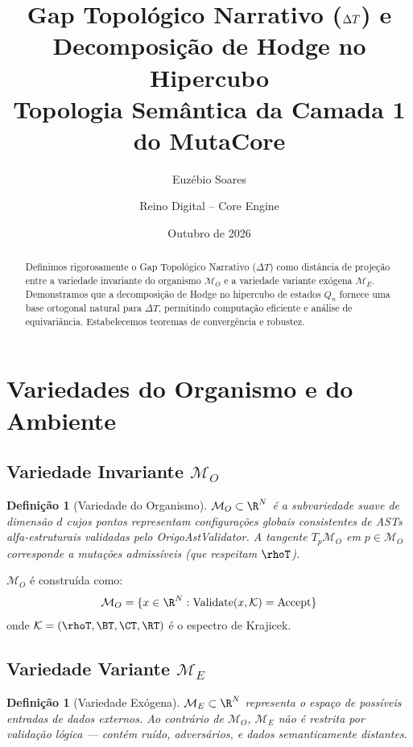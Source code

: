 \documentclass[11pt,a4paper]{article}
\title{
    \vspace{-1cm}
    \textbf{Gap Topológico Narrativo ($\DeltaT$) e Decomposição de Hodge no Hipercubo}\\
    \large Topologia Semântica da Camada 1 do MutaCore
}
\author{Euzébio Soares \and Reino Digital -- Core Engine}
\date{Outubro de 2026}
\newtheorem{definition}[theorem]{Definição}
\newcommand{\DeltaT}{\Delta T}
\newcommand{\MT}{\mathcal{M}_O}
\newcommand{\ME}{\mathcal{M}_E}
\begin{document}
\maketitle

\begin{abstract}
Definimos rigorosamente o Gap Topológico Narrativo ($\DeltaT$) como distância de projeção entre a variedade invariante do organismo $\MT$ e a variedade variante exógena $\ME$. Demonstramos que a decomposição de Hodge no hipercubo de estados $Q_n$ fornece uma base ortogonal natural para $\DeltaT$, permitindo computação eficiente e análise de equivariância. Estabelecemos teoremas de convergência e robustez.
\end{abstract}

\tableofcontents
\newpage

\section{Variedades do Organismo e do Ambiente}

\subsection{Variedade Invariante $\MT$}

\begin{definition}[Variedade do Organismo]
$\MT \subset \R^N$ é a subvariedade suave de dimensão $d$ cujos pontos representam configurações globais consistentes de ASTs alfa-estruturais validadas pelo OrigoAstValidator. A tangente $T_p\MT$ em $p \in \MT$ corresponde a mutações admissíveis (que respeitam $\rhoT$).
\end{definition}

$\MT$ é construída como:
\begin{equation}
    \MT = \{ x \in \R^N : \mathrm{Validate}(x, \mathcal{K}) = \text{Accept} \}
\end{equation}
onde $\mathcal{K} = (\rhoT, \BT, \CT, \RT)$ é o espectro de Krajicek.

\subsection{Variedade Variante $\ME$}

\begin{definition}[Variedade Exógena]
$\ME \subset \R^N$ representa o espaço de possíveis entradas de dados externos. Ao contrário de $\MT$, $\ME$ não é restrita por validação lógica — contém ruído, adversários, e dados semanticamente distantes.
\end{definition}
\end{document}
